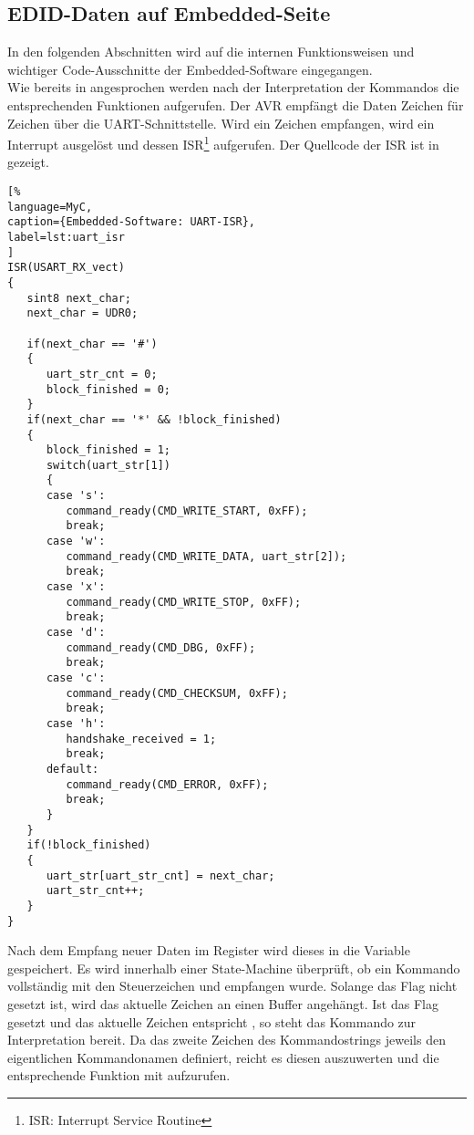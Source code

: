 \subsection{EDID-Daten auf Embedded-Seite}
In den folgenden Abschnitten wird auf die  internen Funktionsweisen und wichtiger Code-Ausschnitte der Embedded-Software eingegangen.\\
Wie bereits in  angesprochen werden nach der Interpretation der Kommandos die entsprechenden Funktionen aufgerufen. Der AVR empfängt die Daten Zeichen für Zeichen über die UART-Schnittstelle. Wird ein Zeichen empfangen, wird ein Interrupt ausgelöst und dessen ISR\footnote{ISR: Interrupt Service Routine} aufgerufen. Der Quellcode der ISR ist in  gezeigt.
\begin{lstlisting}[%
language=MyC,
caption={Embedded-Software: UART-ISR},
label=lst:uart_isr
]
ISR(USART_RX_vect)
{
   sint8 next_char;
   next_char = UDR0;

   if(next_char == '#')
   {
      uart_str_cnt = 0;
      block_finished = 0;
   }
   if(next_char == '*' && !block_finished)
   {
      block_finished = 1;
      switch(uart_str[1])
      {
      case 's':
         command_ready(CMD_WRITE_START, 0xFF);
         break;
      case 'w':
         command_ready(CMD_WRITE_DATA, uart_str[2]);
         break;
      case 'x':
         command_ready(CMD_WRITE_STOP, 0xFF);
         break;
      case 'd':
         command_ready(CMD_DBG, 0xFF);
         break;
      case 'c':
         command_ready(CMD_CHECKSUM, 0xFF);
         break;
      case 'h':
         handshake_received = 1;
         break;
      default:
         command_ready(CMD_ERROR, 0xFF);
         break;
      }
   }
   if(!block_finished)
   {
      uart_str[uart_str_cnt] = next_char;
      uart_str_cnt++;
   }
}
\end{lstlisting}
Nach dem Empfang neuer Daten im Register  wird dieses in die Variable  gespeichert. Es wird innerhalb einer State-Machine überprüft, ob ein Kommando vollständig mit den Steuerzeichen \code{\#} und \code{\*} empfangen wurde. Solange das Flag  nicht gesetzt ist, wird das aktuelle Zeichen an einen Buffer  angehängt. Ist das Flag  gesetzt und das aktuelle Zeichen entspricht \code{\*}, so steht das Kommando zur Interpretation bereit. Da das zweite Zeichen des Kommandostrings  jeweils den eigentlichen Kommandonamen definiert, reicht es diesen auszuwerten und die entsprechende Funktion mit  aufzurufen.
